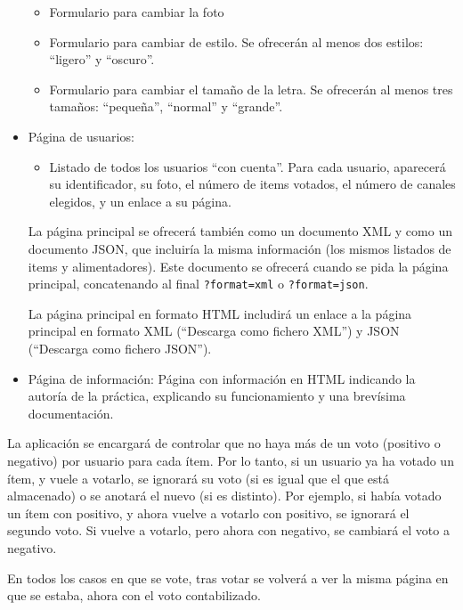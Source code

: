 \begin{itemize}
    \begin{itemize}
    \item Formulario para cambiar la foto
    \item Formulario para cambiar de estilo. Se ofrecerán al menos dos estilos: ``ligero'' y ``oscuro''.
    \item Formulario para cambiar el tamaño de la letra. Se ofrecerán al menos tres tamaños: ``pequeña'', ``normal'' y ``grande''.
    \end{itemize}
    
  \item Página de usuarios:

    \begin{itemize}
    \item Listado de todos los usuarios ``con cuenta''. Para cada usuario, aparecerá su identificador, su foto, el número de items votados, el número de canales elegidos, y un enlace a su página.
    \end{itemize}

  La página principal se ofrecerá también como un documento XML y como un documento JSON, que incluiría la misma información (los mismos listados de items y alimentadores). Este documento se ofrecerá cuando se pida la página principal, concatenando al final \verb|?format=xml| o \verb|?format=json|.

  La página principal en formato HTML includirá un enlace a la página principal en formato XML (``Descarga como fichero XML'') y JSON (``Descarga como fichero JSON'').  
 
  \item Página de información: Página con información en HTML indicando la autoría de la práctica, explicando su funcionamiento y una brevísima documentación.

\end{itemize}

La aplicación se encargará de controlar que no haya más de un voto (positivo o negativo) por usuario para cada ítem. Por lo tanto, si un usuario ya ha votado un ítem, y vuele a votarlo, se ignorará su voto (si es igual que el que está almacenado) o se anotará el nuevo (si es distinto). Por ejemplo, si había votado un ítem con positivo, y ahora vuelve a votarlo con positivo, se ignorará el segundo voto. Si vuelve a votarlo, pero ahora con negativo, se cambiará el voto a negativo.

En todos los casos en que se vote, tras votar se volverá a ver la misma página en que se estaba, ahora con el voto contabilizado.



